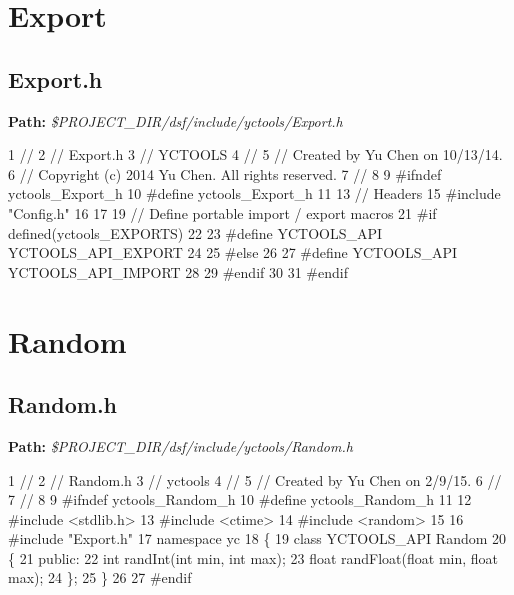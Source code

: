  \hypertarget{yctools_yctoolsExport}{}\section{Export}\label{yctools_yctoolsExport}
\hypertarget{yctools_yctoolsExport_h}{}\subsection{Export.\+h}\label{yctools_yctoolsExport_h}
{\bfseries Path\+:} {\itshape \$\+P\+R\+O\+J\+E\+C\+T\+\_\+\+D\+I\+R/dsf/include/yctools/\+Export.h} 
\begin{DoxyCodeInclude}
1 \textcolor{comment}{//}
2 \textcolor{comment}{//  Export.h}
3 \textcolor{comment}{//  YCTOOLS}
4 \textcolor{comment}{//}
5 \textcolor{comment}{//  Created by Yu Chen on 10/13/14.}
6 \textcolor{comment}{//  Copyright (c) 2014 Yu Chen. All rights reserved.}
7 \textcolor{comment}{//}
8 
9 \textcolor{preprocessor}{#ifndef yctools\_Export\_h}
10 \textcolor{preprocessor}{#define yctools\_Export\_h}
11 
13 \textcolor{comment}{// Headers}
15 \textcolor{comment}{}\textcolor{preprocessor}{#include "Config.h"}
16 
17 
19 \textcolor{comment}{// Define portable import / export macros}
21 \textcolor{comment}{}\textcolor{preprocessor}{#if defined(yctools\_EXPORTS)}
22 
23 \textcolor{preprocessor}{#define YCTOOLS\_API YCTOOLS\_API\_EXPORT}
24 
25 \textcolor{preprocessor}{#else}
26 
27 \textcolor{preprocessor}{#define YCTOOLS\_API YCTOOLS\_API\_IMPORT}
28 
29 \textcolor{preprocessor}{#endif}
30 
31 \textcolor{preprocessor}{#endif}
\end{DoxyCodeInclude}
 \hypertarget{yctools_yctoolsRandom}{}\section{Random}\label{yctools_yctoolsRandom}
\hypertarget{yctools_yctoolsRandom_h}{}\subsection{Random.\+h}\label{yctools_yctoolsRandom_h}
{\bfseries Path\+:} {\itshape \$\+P\+R\+O\+J\+E\+C\+T\+\_\+\+D\+I\+R/dsf/include/yctools/\+Random.h} 
\begin{DoxyCodeInclude}
1 \textcolor{comment}{//}
2 \textcolor{comment}{//  Random.h}
3 \textcolor{comment}{//  yctools}
4 \textcolor{comment}{//}
5 \textcolor{comment}{//  Created by Yu Chen on 2/9/15.}
6 \textcolor{comment}{//}
7 \textcolor{comment}{//}
8 
9 \textcolor{preprocessor}{#ifndef yctools\_Random\_h}
10 \textcolor{preprocessor}{#define yctools\_Random\_h}
11 
12 \textcolor{preprocessor}{#include <stdlib.h>}
13 \textcolor{preprocessor}{#include <ctime>}
14 \textcolor{preprocessor}{#include <random>}
15 
16 \textcolor{preprocessor}{#include "Export.h"}
17 \textcolor{keyword}{namespace }yc
18 \{
19     \textcolor{keyword}{class }YCTOOLS\_API Random
20     \{
21     \textcolor{keyword}{public}:
22         \textcolor{keywordtype}{int} randInt(\textcolor{keywordtype}{int} min, \textcolor{keywordtype}{int} max);
23         \textcolor{keywordtype}{float} randFloat(\textcolor{keywordtype}{float} min, \textcolor{keywordtype}{float} max);
24     \};
25 \}
26 
27 \textcolor{preprocessor}{#endif}
\end{DoxyCodeInclude}
